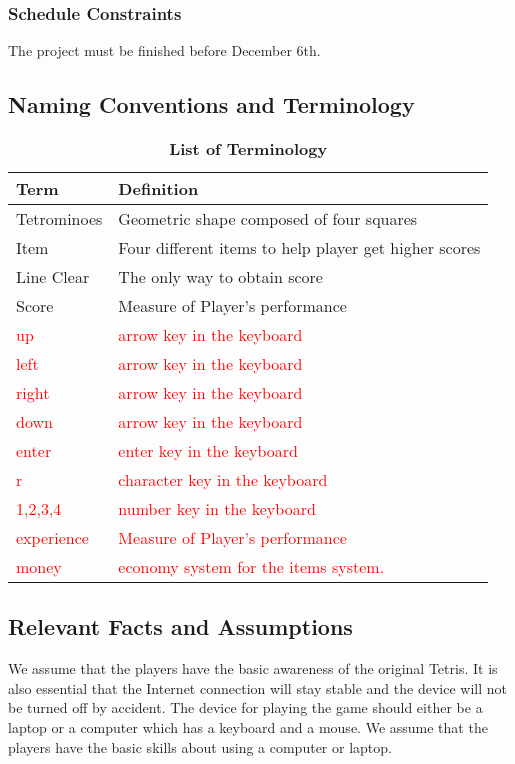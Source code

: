 \documentclass[12pt, titlepage]{article}
\begin{document}
\subsubsection{Schedule Constraints}
\tab The project must be finished before December 6th.



\subsection{Naming Conventions and Terminology}


\begin{table}[h]
\caption{\bf List of Terminology} \label{tab:terminology}
\begin{tabularx}{\textwidth}{p{3cm}X}
\toprule {\bf Term} & {\bf Definition}\\
\midrule
Tetrominoes & Geometric shape composed of four squares\\
Item &  Four different items to help player get higher scores\\
Line Clear & The only way to obtain score\\
Score & Measure of Player's performance\\
\textcolor{red}{up} & \textcolor{red}{ arrow key in the keyboard}\\
\textcolor{red}{ left } &\textcolor{red}{ arrow key in the keyboard}\\
\textcolor{red}{right } & \textcolor{red}{arrow key in the keyboard}\\
\textcolor{red}{ down } & \textcolor{red}{arrow key in the keyboard}\\
\textcolor{red}{ enter } & \textcolor{red}{enter key in the keyboard}\\
\textcolor{red}{  r } & \textcolor{red}{character key in the keyboard}\\
\textcolor{red}{  1,2,3,4 } & \textcolor{red}{number key in the keyboard}\\
\textcolor{red}{  experience  } & \textcolor{red}{Measure of Player's performance}\\
\textcolor{red}{  money } & \textcolor{red}{economy system for the items system.}\\
\bottomrule
\end{tabularx}
\end{table}


\subsection{Relevant Facts and Assumptions}
\tab We assume that the players have the basic awareness of the original Tetris. It is also essential that the Internet connection will stay stable and the device will not be turned off by accident. The device for playing the game should either be a laptop or a computer which has a keyboard and a mouse. We assume that the players have the basic skills about using a computer or laptop. 
\end{document}
